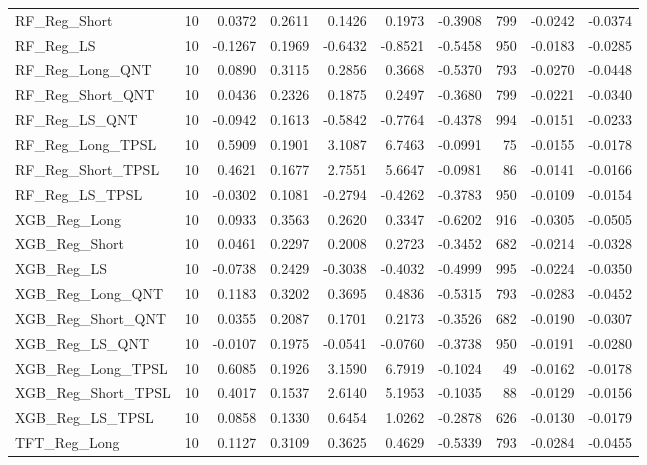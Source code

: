 \begin{tabular}{llrrrrrrrr}
\cline{1-10}
RF\_Reg\_Short & 10 & 0.0372 & 0.2611 & 0.1426 & 0.1973 & -0.3908 & 799 & -0.0242 & -0.0374 \\
\cline{1-10}
RF\_Reg\_LS & 10 & -0.1267 & 0.1969 & -0.6432 & -0.8521 & -0.5458 & 950 & -0.0183 & -0.0285 \\
\cline{1-10}
RF\_Reg\_Long\_QNT & 10 & 0.0890 & 0.3115 & 0.2856 & 0.3668 & -0.5370 & 793 & -0.0270 & -0.0448 \\
\cline{1-10}
RF\_Reg\_Short\_QNT & 10 & 0.0436 & 0.2326 & 0.1875 & 0.2497 & -0.3680 & 799 & -0.0221 & -0.0340 \\
\cline{1-10}
RF\_Reg\_LS\_QNT & 10 & -0.0942 & 0.1613 & -0.5842 & -0.7764 & -0.4378 & 994 & -0.0151 & -0.0233 \\
\cline{1-10}
RF\_Reg\_Long\_TPSL & 10 & 0.5909 & 0.1901 & 3.1087 & 6.7463 & -0.0991 & 75 & -0.0155 & -0.0178 \\
\cline{1-10}
RF\_Reg\_Short\_TPSL & 10 & 0.4621 & 0.1677 & 2.7551 & 5.6647 & -0.0981 & 86 & -0.0141 & -0.0166 \\
\cline{1-10}
RF\_Reg\_LS\_TPSL & 10 & -0.0302 & 0.1081 & -0.2794 & -0.4262 & -0.3783 & 950 & -0.0109 & -0.0154 \\
\cline{1-10}
XGB\_Reg\_Long & 10 & 0.0933 & 0.3563 & 0.2620 & 0.3347 & -0.6202 & 916 & -0.0305 & -0.0505 \\
\cline{1-10}
XGB\_Reg\_Short & 10 & 0.0461 & 0.2297 & 0.2008 & 0.2723 & -0.3452 & 682 & -0.0214 & -0.0328 \\
\cline{1-10}
XGB\_Reg\_LS & 10 & -0.0738 & 0.2429 & -0.3038 & -0.4032 & -0.4999 & 995 & -0.0224 & -0.0350 \\
\cline{1-10}
XGB\_Reg\_Long\_QNT & 10 & 0.1183 & 0.3202 & 0.3695 & 0.4836 & -0.5315 & 793 & -0.0283 & -0.0452 \\
\cline{1-10}
XGB\_Reg\_Short\_QNT & 10 & 0.0355 & 0.2087 & 0.1701 & 0.2173 & -0.3526 & 682 & -0.0190 & -0.0307 \\
\cline{1-10}
XGB\_Reg\_LS\_QNT & 10 & -0.0107 & 0.1975 & -0.0541 & -0.0760 & -0.3738 & 950 & -0.0191 & -0.0280 \\
\cline{1-10}
XGB\_Reg\_Long\_TPSL & 10 & 0.6085 & 0.1926 & 3.1590 & 6.7919 & -0.1024 & 49 & -0.0162 & -0.0178 \\
\cline{1-10}
XGB\_Reg\_Short\_TPSL & 10 & 0.4017 & 0.1537 & 2.6140 & 5.1953 & -0.1035 & 88 & -0.0129 & -0.0156 \\
\cline{1-10}
XGB\_Reg\_LS\_TPSL & 10 & 0.0858 & 0.1330 & 0.6454 & 1.0262 & -0.2878 & 626 & -0.0130 & -0.0179 \\
\cline{1-10}
TFT\_Reg\_Long & 10 & 0.1127 & 0.3109 & 0.3625 & 0.4629 & -0.5339 & 793 & -0.0284 & -0.0455 \\

\end{tabular}
